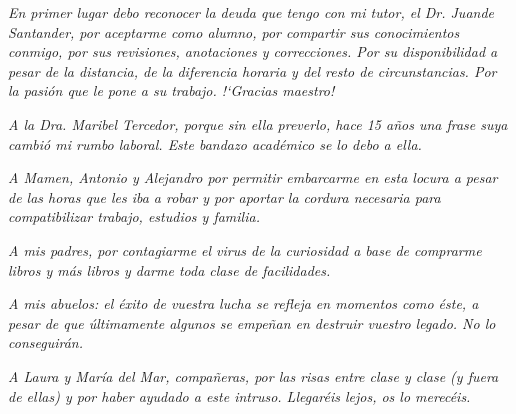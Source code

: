 

\begin{flushright}

\textit{En primer lugar debo reconocer la deuda que tengo con mi tutor, el Dr. Juande Santander, por aceptarme como alumno, por compartir sus conocimientos conmigo, por sus revisiones, anotaciones y correcciones. Por su disponibilidad a pesar de la distancia, de la diferencia horaria y del resto de circunstancias. Por la pasi\'on que le pone a su trabajo. !`Gracias maestro!}


\textit{\newline A la Dra. Maribel Tercedor, porque sin ella preverlo, hace 15 a\~{n}os una frase suya cambi\'o mi rumbo laboral. Este bandazo acad\'emico se lo debo a ella.}


\textit{\newline A Mamen, Antonio y Alejandro por permitir embarcarme en esta locura a pesar de las horas que les iba a robar y por aportar la cordura necesaria para compatibilizar trabajo, estudios y familia.}


\textit{\newline A mis padres, por contagiarme el virus de la curiosidad a base de comprarme libros y m\'as libros y darme toda clase de facilidades.}


\textit{\newline A mis abuelos: el \'exito de vuestra lucha se refleja en momentos como \'este, a pesar de que \'ultimamente algunos se empe\~{n}an en destruir vuestro legado. No lo conseguir\'an.}


\textit{\newline A Laura y Mar\'ia del Mar, compa\~{n}eras, por las risas entre clase y clase (y fuera de ellas) y por haber ayudado a este \emph{intruso}. Llegar\'eis lejos, os lo merec\'eis.} 

\end{flushright}
